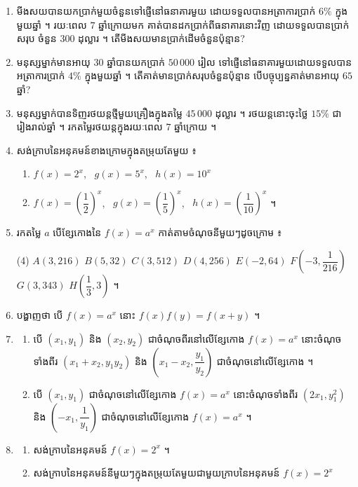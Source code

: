 \begin{enumerate}[1]
\begin{tasks}
  \end{tasks}
  \item មីងសយបានយកប្រាក់មួយចំនួនទៅផ្ញើនៅធនាគារមួយ ដោយទទួលបានអត្រាការប្រាក់ $6\%$ ក្នុងមួយឆ្នាំ ។ រយៈពេល $7$ ឆ្នាំក្រោយមក គាត់បានដកប្រាក់ពីធនាគារនោះវិញ ដោយទទួលបានប្រាក់សរុប ចំនួន $300$ ដុល្លារ ។ តើមីងសយមានប្រាក់ដើមចំនួនប៉ុន្មាន?
  \item មនុស្សម្នាក់មានអាយុ $30$ ឆ្នាំបានយកប្រាក់ $50\,000$ រៀល ទៅផ្ញើនៅធនាគារមួយដោយទទួលបានអត្រាការប្រាក់ $4\%$ ក្នុងមួយឆ្នាំ ។ តើគាត់មានប្រាក់សរុបចំនួនប៉ុន្មាន បើបច្ចុប្បន្នគាត់មានអាយុ $65$ ឆ្នាំ?
  \item មនុស្សម្នាក់បានទិញរថយន្តថ្មីមួយគ្រឿងក្នុងតម្លៃ $45\,000$ ដុល្លារ ។ រថយន្តនោះចុះថ្លៃ $15\%$ ជារៀងរាល់ឆ្នាំ ។ រកតម្លៃរថយន្តក្នុងរយៈពេល $7$ ឆ្នាំក្រោយ ។
  \item សង់ក្រាបនៃអនុគមន៍ខាងក្រោមក្នុងតម្រុយតែមួយ ៖
  \begin{enumerate}[a]
    \item $f(x) = 2^x$, \ $g(x) = 5^x$, \ $h(x) = 10^x$
    \item $f(x) = \left(\dfrac{1}{2}\right)^x$, \ $g(x) = \left(\dfrac{1}{5}\right)^x$, \ $h(x) = \left(\dfrac{1}{10}\right)^x$ ។
  \end{enumerate}
  \item រកតម្លៃ $a$ បើខ្សែកោងនៃ $f(x) = a^x$ កាត់តាមចំណុចនីមួយៗដូចក្រោម ៖
  \begin{tasks}(4)
    \task $A(3, 216)$
    \task $B(5, 32)$
    \task $C(3, 512)$
    \task $D(4, 256)$
    \task $E(-2, 64)$
    \task $F\left(-3, \dfrac{1}{216}\right)$
    \task $G(3, 343)$
    \task $H\left(\dfrac{1}{3}, 3\right)$ ។
  \end{tasks}
  \item បង្ហាញថា បើ $f(x) = a^x$ នោះ $f(x)f(y) = f(x + y)$ ។
  \item
  \begin{enumerate}[a]
    \item បើ $(x_1, y_1)$ និង $(x_2, y_2)$ ជាចំណុចពីរនៅលើខ្សែកោង $f(x) = a^x$ នោះចំណុចទាំងពីរ $(x_1 + x_2, y_1y_2)$ និង $\left(x_1 - x_2, \dfrac{y_1}{y_2}\right)$ ជាចំណុចនៅលើខ្សែកោង ។
    \item បើ $(x_1, y_1)$ ជាចំណុចនៅលើខ្សែកោង $f(x) = a^x$ នោះចំណុចទាំងពីរ $(2x_1, y_1^2)$ និង $\left(-x_1, \dfrac{1}{y_1}\right)$ ជាចំណុចនៅលើខ្សែកោង $f(x) = a^x$ ។
  \end{enumerate}
  \item
  \begin{enumerate}[a]
    \item សង់ក្រាបនៃអនុគមន៍ $f(x) = 2^x$ ។
    \item សង់ក្រាបនៃអនុគមន៍នីមួយៗក្នុងតម្រុយតែមួយជាមួយក្រាបនៃអនុគមន៍ $f(x) = 2^x$

\end{enumerate}
\end{enumerate}
